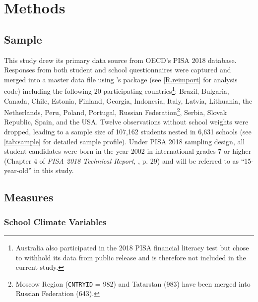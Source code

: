 \documentclass[a4paper,11pt,UKenglish,twoside,openright]{report}\usepackage[]{graphicx}\usepackage[]{color}
\begin{document}



\chapter{Methods}
\label{chp:3}

\section{Sample}

This study drew its primary data source from OECD's PISA 2018 database. Responses from both student \parencite{FLdata} and school questionnaires \parencite{SCHdata} were captured and merged into a master data file using \CR's \parencite[Version 4.0.5,][]{R}  package \parencite[Version 2.5,][]{intsvy} (see \cref{R.reimport} for analysis code) including the following 20 participating countries\footnote{Australia also participated in the 2018 PISA financial literacy test but chose to withhold its data from public release and is therefore not included in the current study.}: Brazil, Bulgaria, Canada, Chile, Estonia, Finland, Georgia, Indonesia, Italy, Latvia, Lithuania, the Netherlands, Peru, Poland, Portugal, Russian Federation\footnote{Moscow Region (\texttt{CNTRYID} = 982) and Tatarstan (983) have been merged into Russian Federation (643).}, Serbia, Slovak Republic, Spain, and the USA. Twelve observations without school weights were dropped, leading to a sample size of 107,162 students nested in 6,631 schools (see \cref{tab:sample} for detailed sample profile). Under PISA 2018 sampling design, all student candidates were born in the year 2002 in international grades 7 or higher (Chapter 4 of \textit{PISA 2018 Technical Report}, \textcite{PISAtech}, p. 29) and will be referred to as ``15-year-old'' in this study.

\section{Measures}

\subsection{School Climate Variables}
\end{document}
